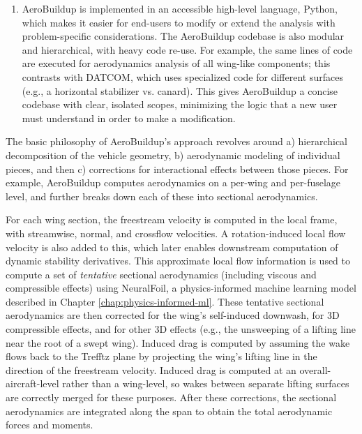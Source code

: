 \begin{enumerate}
    \item AeroBuildup is implemented in an accessible high-level language, Python, which makes it easier for end-users to modify or extend the analysis with problem-specific considerations. The AeroBuildup codebase is also modular and hierarchical, with heavy code re-use. For example, the same lines of code are executed for aerodynamics analysis of all wing-like components; this contrasts with DATCOM, which uses specialized code for different surfaces (e.g., a horizontal stabilizer vs. canard). This gives AeroBuildup a concise codebase with clear, isolated scopes, minimizing the logic that a new user must understand in order to make a modification.

\end{enumerate}

The basic philosophy of AeroBuildup's approach revolves around a) hierarchical decomposition of the vehicle geometry, b) aerodynamic modeling of individual pieces, and then c) corrections for interactional effects between those pieces. For example, AeroBuildup computes aerodynamics on a per-wing and per-fuselage level, and further breaks down each of these into sectional aerodynamics.

For each wing section, the freestream velocity is computed in the local frame, with streamwise, normal, and crossflow velocities. A rotation-induced local flow velocity is also added to this, which later enables downstream computation of dynamic stability derivatives. This approximate local flow information is used to compute a set of \emph{tentative} sectional aerodynamics (including viscous and compressible effects) using NeuralFoil, a physics-informed machine learning model described in Chapter \ref{chap:physics-informed-ml}. These tentative sectional aerodynamics are then corrected for the wing's self-induced downwash, for 3D compressible effects, and for other 3D effects (e.g., the unsweeping of a lifting line near the root of a swept wing). Induced drag is computed by assuming the wake flows back to the Trefftz plane by projecting the wing's lifting line in the direction of the freestream velocity. Induced drag is computed at an overall-aircraft-level rather than a wing-level, so wakes between separate lifting surfaces are correctly merged for these purposes. After these corrections, the sectional aerodynamics are integrated along the span to obtain the total aerodynamic forces and moments.

